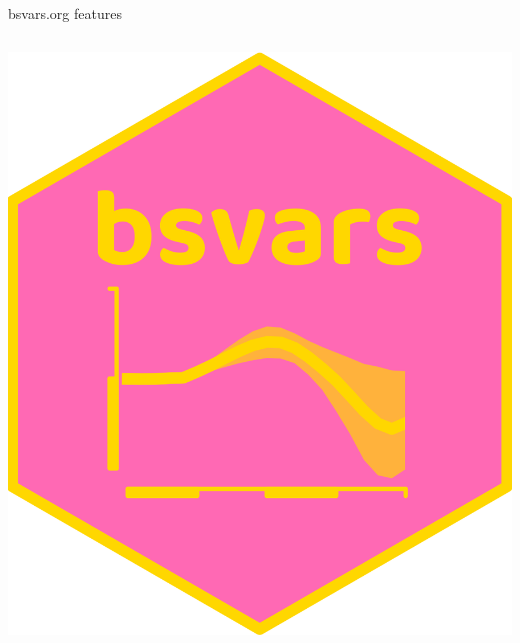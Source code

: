 \documentclass[aspectratio=1610,notes,blackandwhite,mathsans,usenames,dvipsnames]{beamer}
\begin{document}
	\begin{frame}{\huge bsvars.org features}
		\Large		
		
		\begin{columns}
        		\begin{column}{0.5\textwidth}
				\includegraphics[scale=0.35]{bsvars}\\[1ex]


\end{column}
\end{columns}
\end{frame}
\end{document}
